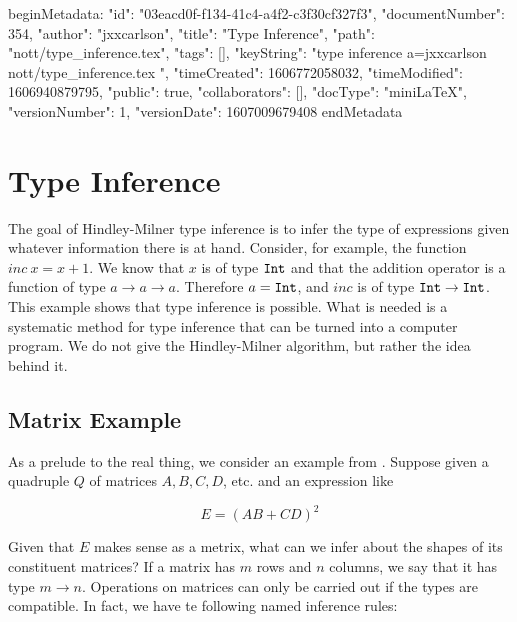 beginMetadata:
{
    "id": "03eacd0f-f134-41c4-a4f2-c3f30cf327f3",
    "documentNumber": 354,
    "author": "jxxcarlson",
    "title": "Type Inference",
    "path": "nott/type_inference.tex",
    "tags": [],
    "keyString": "type inference a=jxxcarlson nott/type_inference.tex ",
    "timeCreated": 1606772058032,
    "timeModified": 1606940879795,
    "public": true,
    "collaborators": [],
    "docType": "miniLaTeX",
    "versionNumber": 1,
    "versionDate": 1607009679408
}
endMetadata

\setcounter{section}{5}



\section{Type Inference}

\innertableofcontents

The goal of Hindley-Milner type inference is to infer the type of expressions given whatever information there is at hand.  Consider, for example, the function $inc\ x = x + 1$.  We know that $x$ is of type ${\tt Int}$ and that the addition operator is a function of type $a \to a \to a$.  Therefore $a = {\tt Int}$, and $inc$ is of type ${\tt Int} \to {\tt Int}$. This  example shows that type inference is possible.  What is needed is a systematic method for type inference that can be turned into a computer program.  We do not give the Hindley-Milner algorithm, but rather the idea behind it.

\subsection{Matrix Example}

As a prelude to the real thing, we consider an example from  \cite{1}.  Suppose given a quadruple $Q$ of matrices $A, B, C, D$, etc. and an expression like 

\begin{equation}
\label{unif:expr}
E = (AB + CD)^2
\end{equation}


Given that $E$ makes sense as a metrix, what can we infer about the shapes of its constituent matrices?  If a matrix has $m$ rows and $n$ columns, we say that it has type $m \to n$.  Operations on matrices can only be carried out if the types are compatible.  In fact, we have te following named inference rules:

